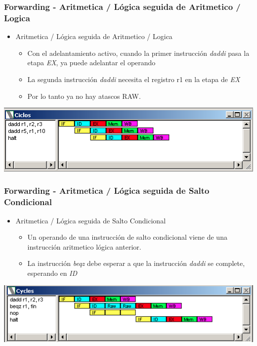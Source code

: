 \documentclass{beamer}
\begin{document}
\begin{frame}[fragile]
\frametitle{Forwarding - Aritmetica / Lógica seguida de Aritmetico / Logica}
\begin{itemize}
\item Aritmetica / Lógica seguida de Aritmetico / Logica
\begin{itemize}
\item Con el adelantamiento activo, cuando la primer instrucción \emph{daddi} pasa la etapa \emph{EX}, ya puede adelantar el operando
\item La segunda instrucción \emph{daddi} necesita el registro r1 en la etapa de \emph{EX}
\item Por lo tanto ya no hay atascos RAW.
\end{itemize}
\end{itemize}
\includegraphics[scale=0.45]{forwarding-5-aritmetica-aritmetica.png}
\end{frame}


\begin{frame}[fragile]
\frametitle{Forwarding - Aritmetica / Lógica seguida de Salto Condicional}
\begin{itemize}
\item Aritmetica / Lógica seguida de Salto Condicional
\begin{itemize}
\item Un operando de una instrucción de salto condicional viene de una instrucción aritmetico lógica anterior.
\item La instrucción \emph{beqz} debe esperar a que la instrucción \emph{daddi} se complete, esperando en \emph{ID}
\end{itemize}
\end{itemize}
\includegraphics[scale=0.45]{forwarding-6.png}
\end{frame}
\end{document}
